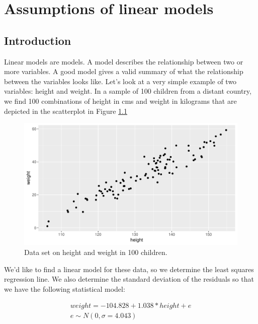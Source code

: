 \documentclass[]{book}\usepackage[]{graphicx}\usepackage[]{color}
\makeatletter
\def\maxwidth{ %
  \ifdim\Gin@nat@width>\linewidth
    \linewidth
  \else
    \Gin@nat@width
  \fi
}
\newenvironment{knitrout}{}{} %
\makeatother
\begin{document}
\chapter{Assumptions of linear models}\label{chap:assumptions}


\section{Introduction}
Linear models are models. A model describes the relationship between two or more variables. A good model gives a valid summary of what the relationship between the variables looks like. Let's look at a very simple example of two variables: height and weight. In a sample of 100 children from a distant country, we find 100 combinations of height in cms and weight in kilograms that are depicted in the scatterplot in Figure \ref{fig:ass_1}

\begin{knitrout}
\color{fgcolor}\begin{figure}

{\centering \includegraphics[width=\maxwidth]{figure/ass_1-1} 

}

\caption[Data set on height and weight in 100 children]{Data set on height and weight in 100 children.}\label{fig:ass_1}
\end{figure}


\end{knitrout}

We'd like to find a linear model for these data, so we determine the least squares regression line. We also determine the standard deviation of the residuals so that we have the following statistical model:

\begin{eqnarray}
weight = -104.828 + 1.038* height + e \\
e \sim N(0, \sigma = 4.043) 
\end{eqnarray}
\end{document}
